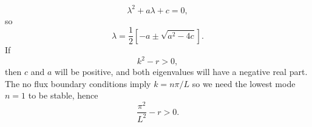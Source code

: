 \documentclass[a4paper, 12pt]{article}
\begin{document}
\begin{enumerate}[label={\bf \arabic{*}.\;}, ref={\arabic{*}},itemsep=3ex, left=0ex]
{\begin{enumerate}[label=(\alph*)]
{            \begin{equation}
              \lambda^2 + a\lambda + c =0,
            \end{equation}
            so
            \begin{equation}
              \lambda = \frac{1}{2}\left[-a \pm \sqrt{a^2 -4c}\right].
            \end{equation}
            If
            \begin{equation}
              k^2-r>0,
            \end{equation}
            then $c$ and $a$ will be positive, and both eigenvalues will have a negative real part.
            The no flux boundary conditions imply $k ={n\pi}/{L}$ so we need the lowest mode $n=1$ to be stable, hence
            \begin{equation}
              \frac{\pi^2}{L^2} -r>0.
            \end{equation}
          }

      \end{enumerate}

    }



\end{enumerate}
\end{document}
